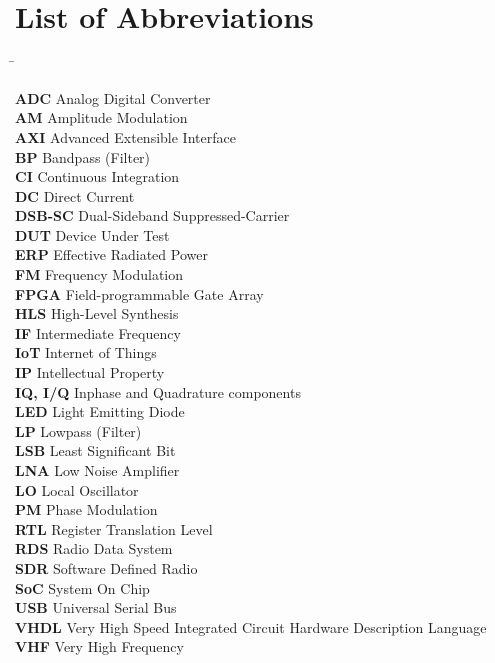 \chapter{List of Abbreviations}
\label{cha:listabbrev}

\begin{tabbing}
\hspace{25 mm}\=\kill

\textbf{ADC}       \> Analog Digital Converter\\
\textbf{AM}        \> Amplitude Modulation\\
\textbf{AXI}       \> Advanced Extensible Interface\\
\textbf{BP}        \> Bandpass (Filter)\\
\textbf{CI}        \> Continuous Integration\\
\textbf{DC}        \> Direct Current\\
\textbf{DSB-SC}    \> Dual-Sideband Suppressed-Carrier\\
\textbf{DUT}       \> Device Under Test\\
\textbf{ERP}       \> Effective Radiated Power\\
\textbf{FM}        \> Frequency Modulation\\
\textbf{FPGA}      \> Field-programmable Gate Array\\
\textbf{HLS}       \> High-Level Synthesis\\
\textbf{IF}        \> Intermediate Frequency\\
\textbf{IoT}       \> Internet of Things\\
\textbf{IP}        \> Intellectual Property\\
\textbf{IQ, I/Q}   \> Inphase and Quadrature components\\
\textbf{LED}       \> Light Emitting Diode\\
\textbf{LP}        \> Lowpass (Filter)\\
\textbf{LSB}       \> Least Significant Bit\\
\textbf{LNA}       \> Low Noise Amplifier\\
\textbf{LO}        \> Local Oscillator\\
\textbf{PM}        \> Phase Modulation\\
\textbf{RTL}       \> Register Translation Level\\
\textbf{RDS}       \> Radio Data System\\
\textbf{SDR}       \> Software Defined Radio\\
\textbf{SoC}       \> System On Chip\\
\textbf{USB}       \> Universal Serial Bus\\
\textbf{VHDL}      \> Very High Speed Integrated Circuit Hardware Description Language\\
\textbf{VHF}       \> Very High Frequency\\

\end{tabbing}
